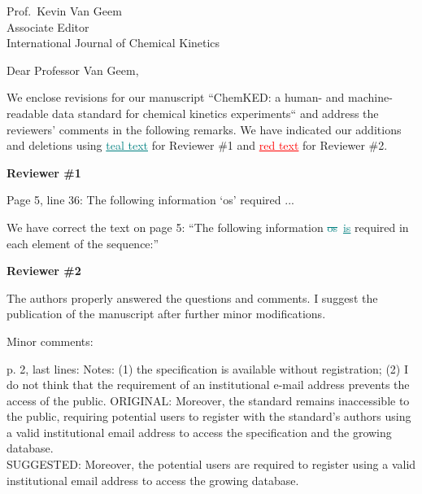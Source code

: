 \documentclass[11pt]{OSUletter}
\date{\vspace{10mm} \today}
\makeatletter
\newcommand{\addone}[1]{{\sloppy\textcolor{teal}{\uline{#1}}}}  %
\newcommand{\deleteone}[1]{\sloppy\textcolor{teal}{\sout{#1}}}    %
\newcommand{\addtwo}[1]{{\sloppy\textcolor{red}{\uline{#1}}}}  %
\def\Where{\hspace{-1.2mm}\textbf{\color{osuorange}
School of Mechanical, Industrial, and Manufacturing Engineering
}}
\def\Address{320 Rogers Hall\\
2000 SW Monroe Ave
}
\def\CityZip{Corvallis, OR~~97331-6001}
\def\Email{{\color{osuorange}email}: kyle.niemeyer@oregonstate.edu}
\def\TEL{{\color{osuorange}P}: 541-737-5614}
\def\URL{{\color{osuorange}URL}: \url{https://niemeyer-research-group.github.io}}
\def\newaddress{
\Where\\
\Address\\
\CityZip\\
\TEL\\
\Email\\
\URL
}
\makeatother
\begin{document}
%
%
%
\begin{letter}{
               Prof.~Kevin Van Geem\\
               Associate Editor\\
               International Journal of Chemical Kinetics
               }
%

%
\opening{Dear Professor Van Geem,}

%
We enclose revisions for our manuscript ``ChemKED: a human- and machine-readable
data standard for chemical kinetics experiments``
and address the reviewers' comments in the following remarks.
We have indicated our additions and deletions using \addone{teal text}
for Reviewer \#1 and \addtwo{red text} for Reviewer \#2.


{\bf Reviewer \#1}
\begin{quoting}
Page 5, line 36: The following information `os' required ...
\end{quoting}

We have correct the text on page 5: ``The following information
\deleteone{os}~\addone{is} required in each element of the sequence:''

\vspace{2em}


{\bf Reviewer \#2}
\begin{quoting}
    The authors properly answered the questions and comments. I suggest the publication
    of the manuscript after further minor modifications.

    Minor comments:

    p. 2, last lines:
    Notes: (1) the specification is available without registration; (2) I do not think
    that the requirement of an institutional e-mail address prevents the access of the public.
    ORIGINAL:
    Moreover, the standard remains inaccessible to the public, requiring potential
    users to register with the standard's authors using a valid institutional email
    address to access the specification and the growing database. \\
    SUGGESTED:
    Moreover, the potential users are required to register using a valid institutional
    email address to access the growing database.
\end{quoting}




\end{letter}
\end{document}
